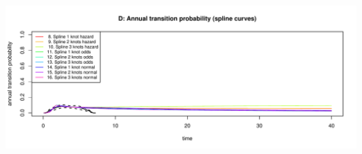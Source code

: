 \documentclass[
]{article}
\begin{document}
\begin{flushleft}\includegraphics[height=0.29\textheight]{Images/validate_extrapolation1-4} \end{flushleft}

\begin{table}


\end{table}
\end{document}
